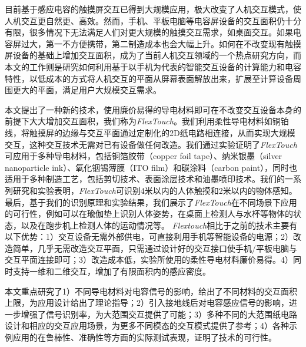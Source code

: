 \begin{cabstract}
  目前基于感应电容的触摸屏交互已得到大规模应用，极大改变了人机交互模式，使人机交互更自然更、高效。然而，手机、平板电脑等电容屏设备的交互面积仍十分有限，很多情况下无法满足人们对更大规模的触摸交互需求，如桌面交互。如果电容屏过大，第一不方便携带，第二制造成本也会大幅上升。如何在不改变现有触摸屏设备的基础上增加交互面积，成为了当前人机交互领域的一个热点研究方向，而本文的工作则是研究如何利用基于以手机为代表的智能交互设备的计算能力和电容特性，以低成本的方式将人机交互的平面从屏幕表面解放出来，扩展至计算设备周围更大的平面，满足用户大规模交互需求。

  本文提出了一种新的技术，使用廉价易得的导电材料即可在不改变交互设备本身的前提下大大增加交互面积，我们称为\textit{FlexTouch}。我们利用柔性导电材料如铜铂线，将触摸屏的边缘与交互平面通过定制化的2D纸电路相连接，从而实现大规模交互，这种交互技术无需对已有设备做任何改造。我们通过实验证明了\textit{FlexTouch}可应用于多种导电材料，包括铜箔胶带（copper foil tape）、纳米银墨（silver nanoparticle ink）、氧化铟锡薄膜（ITO film）和碳涂料（carbon paint），同时也适用于多种制造工艺，包括剪切技术、表面涂层技术和油墨喷印技术。我们的一系列研究和实验表明，\textit{FlexTouch}可识别4米以内的人体触摸和2米以内的物体感知。最后，基于我们的识别原理和实验结果，我们展示了\textit{FlexTouch}在不同场景下应用的可行性，例如可以在瑜伽垫上识别人体姿势，在桌面上检测人与水杯等物体的状态，以及在跑步机上检测人体的运动情况等。 \textit{Flextouch}相比于之前的技术主要有以下优势：1）交互设备无需外部供电，可直接利用手机等智能设备的电源；2）改造简单，几乎无需改造交互平面，只需通过设计好的交互接口使手机/平板电脑与交互平面连接即可；3）改造成本低，实验所使用的柔性导电材料廉价易得。4）同时支持一维和二维交互，增加了有限面积内的感应密度。
    
  本文重点研究了1）不同导电材料对电容信号的影响，给出了不同材料的交互面积上限，为应用设计给出了理论指导；2）引入接地线后对电容感应信号的影响，进一步增强了信号识别率，为大范围交互提供了可能；3）多种不同的大范围纸电路设计和相应的交互应用场景，为更多不同模态的交互模式提供了参考；4）各种示例应用的在鲁棒性、准确性等方面的实际测试表现，证明了技术的可行性。
    
\end{cabstract}


